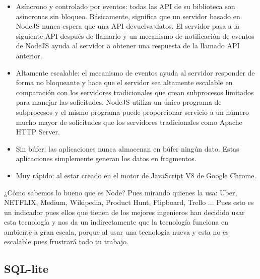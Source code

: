 \documentclass[a4paper, 11pt]{article}
\begin{document}
\begin{itemize}
          \begin{itemize}
            \item{Asíncrono y controlado por eventos: todas las API de su
                  biblioteca son asíncronas sin bloqueo. Básicamente, significa
                  que un servidor basado en NodeJS nunca espera que una API
                  devuelva datos. El servidor pasa a la siguiente API después de
                  llamarlo y un mecanismo de notificación de eventos de NodeJS
                  ayuda al servidor a obtener una respuesta de la llamado API
                  anterior.}
            \item{Altamente escalable: el mecanismo de eventos ayuda al servidor
                  responder de forma no bloqueante y hace que el servidor sea
                  altamente escalable en comparación con los servidores
                  tradicionales que crean subprocesos limitados para manejar las
                  solicitudes. NodeJS utiliza un único programa de subprocesos y
                  el mismo programa puede proporcionar servicio a un número mucho
                  mayor de solicitudes que los servidores tradicionales como
                  Apache HTTP Server.}
            \item{Sin búfer: las aplicaciones nunca almacenan en búfer ningún
                  dato. Estas aplicaciones simplemente generan los datos en
                  fragmentos.}
            \item{Muy rápido: al estar creado en el motor de JavaScript V8 de
                  Google Chrome.}
          \end{itemize}


          ¿Cómo sabemos lo bueno que es Node? Pues mirando quienes la usa: Uber,
          NETFLIX, Medium, Wikipedia, Product Hunt, Flipboard, Trello ... Pues
          esto es un indicador pues ellos que tienen de los mejores ingenieros
          han decidido usar esta tecnología y nos da un indirectamente que la
          tecnología funciona en ambiente a gran escala, porque al usar una
          tecnología nueva y esta no es escalable pues frustrará todo tu trabajo.\\

        \subsection{SQL-lite}\\


\end{itemize}
\end{document}
